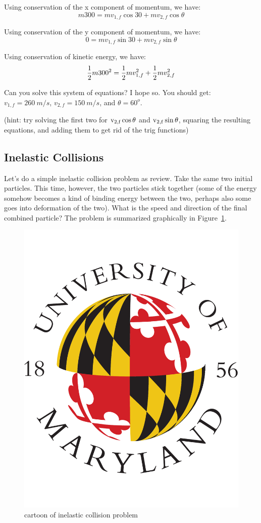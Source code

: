 Using conservation of the x component of momentum, we have:
$$ m 300 = m v_{1,f} \cos{30} + m v_{2,f} \cos{\theta} $$

Using conservation of the y component of momentum, we have:
$$ 0 = m v_{1,f} \sin{30} + m v_{2,f} \sin{\theta} $$

Using conservation of kinetic energy, we have:
$$ {1 \over 2} m 300^2 = {1 \over 2} m v_{1,f}^2 + {1 \over 2} m v_{2,f}^2 $$

Can you solve this system of equations?  I hope so.  You should get:
$v_{1,f}=260~m/s$, $v_{2,f}=150~m/s$, and $\theta = 60^o$.

(hint: try solving the first two for 
${\rm v_{2,f} \cos{\theta}}$ and ${\rm v_{2,f} \sin{\theta}}$, 
squaring the resulting equations, and adding them to get rid of the trig functions)

\subsection{Inelastic Collisions}

Let's do a simple inelastic collision problem as review.  Take the same two initial particles.  This time, however, the two particles stick together (some of the energy somehow becomes a kind of binding energy between the two, perhaps also some goes into deformation of the two).  What is the speed and direction of the final combined particle?  The problem is summarized graphically in Figure~\ref{fig:inelastic}.
 
\begin{figure}[h]
\centering\includegraphics[scale=0.5]{./collisions/Pictures/placeholder.pdf}
\caption{cartoon of inelastic collision problem}
\label{fig:inelastic}
\end{figure}
